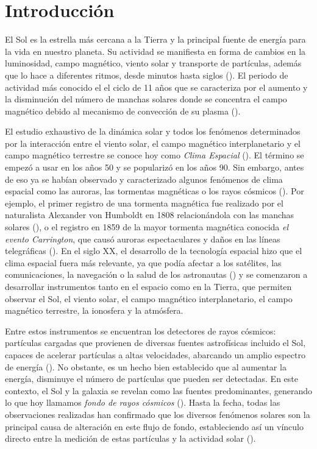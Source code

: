 \newpage
\chapter*{Introducción}
\label{sec:intro}

\noindent El Sol es la estrella más cercana a la Tierra y la principal fuente de energía para la vida en nuestro planeta. Su actividad se manifiesta en forma de cambios en la luminosidad, campo magnético, viento solar y transporte de partículas, además que lo hace a diferentes ritmos, desde minutos hasta siglos  (\cite{Balogh_2008}). El periodo de actividad más conocido el el ciclo de 11 años que se caracteriza por el aumento y la disminución del número de manchas solares donde se concentra el campo magnético debido al mecanismo de convección de su plasma (\cite{Balogh_2008}).

El estudio exhaustivo de la dinámica solar y todos los fenómenos determinados por la interacción entre el viento solar, el campo magnético interplanetario y el campo magnético terrestre se conoce hoy como \textit{Clima Espacial} (\cite{singh_2021}). El término se empezó a usar en los años 50 y se popularizó en los años 90. Sin embargo, antes de eso ya se habían observado y caracterizado algunos fenómenos de clima espacial como las auroras, las tormentas magnéticas o los rayos cósmicos (\cite{cade_2015}). Por ejemplo, el primer registro de una tormenta magnética fue realizado por el naturalista Alexander von Humboldt en 1808 relacionándola con las manchas solares (\cite{Lakhina_2007}), o el registro en 1859 de la mayor tormenta magnética conocida \textit{el evento Carrington}, que causó auroras espectaculares y daños en las líneas telegráficas (\cite{hayakawa_2019}). En el siglo XX, el desarrollo de la tecnología espacial hizo que el clima espacial fuera más relevante, ya que podía afectar a los satélites, las comunicaciones, la navegación o la salud de los astronautas (\cite{Schrijver_2015}) y se comenzaron a desarrollar instrumentos tanto en el espacio como en la Tierra, que permiten observar el Sol, el viento solar, el campo magnético interplanetario, el campo magnético terrestre, la ionosfera y la atmósfera. 

Entre estos instrumentos se encuentran los detectores de rayos cósmicos: partículas cargadas que provienen de diversas fuentes astrofísicas incluido el Sol, capaces de acelerar partículas a altas velocidades, abarcando un amplio espectro de energía (\cite{spurio_2015}).  No obstante, es un hecho bien establecido que al aumentar la energía, disminuye el número de partículas que pueden ser detectadas. En este contexto, el Sol y la galaxia se revelan como las fuentes predominantes, generando lo que hoy llamamos \textit{fondo de rayos cósmicos} (\cite{gaisser_2016}). Hasta la fecha, todas las observaciones realizadas han confirmado que los diversos fenómenos solares son la principal causa de alteración en este flujo de fondo, estableciendo así un vínculo directo entre la medición de estas partículas y la actividad solar (\cite{forbush_1954}).

